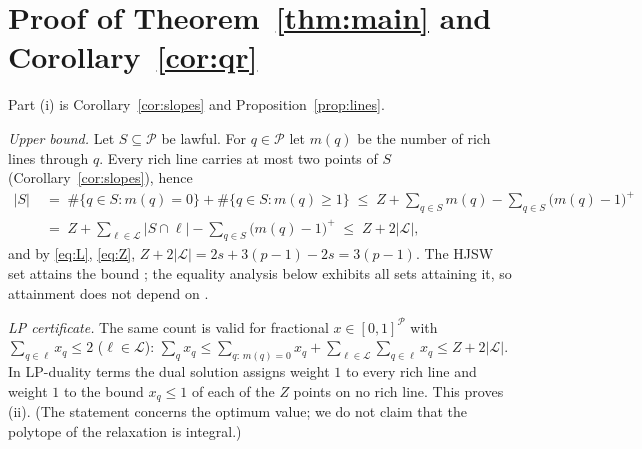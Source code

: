 \documentclass[11pt]{article}
\theoremstyle{remark}
\newcommand{\Lc}{\mathcal{L}}
\newcommand{\Pset}{\mathcal{P}}
\begin{document}
\section{Proof of Theorem~\ref{thm:main} and Corollary~\ref{cor:qr}}\label{sec:proof}

Part (i) is Corollary~\ref{cor:slopes} and Proposition~\ref{prop:lines}.

\smallskip\noindent\emph{Upper bound.}
Let $S\subseteq\Pset$ be lawful.  For $q\in\Pset$ let $m(q)$ be the number of rich lines through $q$.  Every rich line
carries at most two points of $S$ (Corollary~\ref{cor:slopes}), hence
\begin{equation}\label{eq:count}
\begin{aligned}
 |S| \;&=\; \#\{q\in S: m(q)=0\}+\#\{q\in S: m(q)\ge1\}
 \;\le\; Z+\sum_{q\in S}m(q)-\sum_{q\in S}\bigl(m(q)-1\bigr)^{+}\\
 &=\; Z+\sum_{\ell\in\Lc}|S\cap\ell|-\sum_{q\in S}\bigl(m(q)-1\bigr)^{+}
 \;\le\; Z+2|\Lc| ,
\end{aligned}
\end{equation}
and by \eqref{eq:L}, \eqref{eq:Z}, $Z+2|\Lc|=2s+3(p-1)-2s=3(p-1)$.  The HJSW set attains the bound \cite{HJSW75}; the
equality analysis below exhibits all sets attaining it, so attainment does not depend on \cite{HJSW75}.

\smallskip\noindent\emph{LP certificate.}  The same count is valid for fractional $x\in[0,1]^{\Pset}$ with
$\sum_{q\in\ell}x_q\le2$ ($\ell\in\Lc$): $\sum_q x_q\le\sum_{q:\,m(q)=0}x_q+\sum_{\ell\in\Lc}\sum_{q\in\ell}x_q\le Z+2|\Lc|$.
In LP-duality terms the dual solution assigns weight $1$ to every rich line and weight $1$ to the bound $x_q\le1$ of each
of the $Z$ points on no rich line.  This proves (ii).  (The statement concerns the optimum value; we do not claim that the
polytope of the relaxation is integral.)
\end{document}
